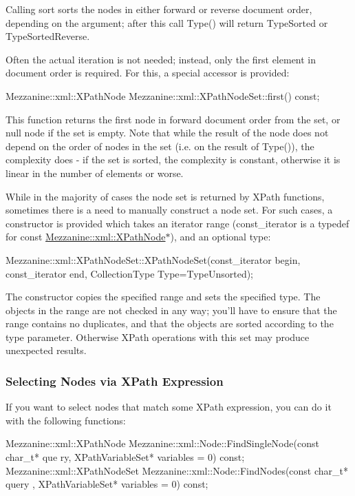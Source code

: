 Calling sort sorts the nodes in either forward or reverse document order, depending on the argument; after this call Type() will return TypeSorted or TypeSortedReverse. \par
 \par
 Often the actual iteration is not needed; instead, only the first element in document order is required. For this, a special accessor is provided: 
\begin{DoxyCode}
 Mezzanine::xml::XPathNode Mezzanine::xml::XPathNodeSet::first() const;
\end{DoxyCode}
 This function returns the first node in forward document order from the set, or null node if the set is empty. Note that while the result of the node does not depend on the order of nodes in the set (i.e. on the result of Type()), the complexity does -\/ if the set is sorted, the complexity is constant, otherwise it is linear in the number of elements or worse. \par
 \par
 While in the majority of cases the node set is returned by XPath functions, sometimes there is a need to manually construct a node set. For such cases, a constructor is provided which takes an iterator range (const\_\-iterator is a typedef for const \hyperlink{classMezzanine_1_1xml_1_1XPathNode}{Mezzanine::xml::XPathNode}$\ast$), and an optional type: 
\begin{DoxyCode}
 Mezzanine::xml::XPathNodeSet::XPathNodeSet(const_iterator begin, const_iterator 
      end, CollectionType Type=TypeUnsorted);
\end{DoxyCode}
 The constructor copies the specified range and sets the specified type. The objects in the range are not checked in any way; you'll have to ensure that the range contains no duplicates, and that the objects are sorted according to the type parameter. Otherwise XPath operations with this set may produce unexpected results. \par
 \par
 \hypertarget{XMLManual_XMLXPathSelecting}{}\subsubsection{Selecting Nodes via XPath Expression}\label{XMLManual_XMLXPathSelecting}
If you want to select nodes that match some XPath expression, you can do it with the following functions: 
\begin{DoxyCode}
 Mezzanine::xml::XPathNode Mezzanine::xml::Node::FindSingleNode(const char_t* que
      ry, XPathVariableSet* variables = 0) const;
 Mezzanine::xml::XPathNodeSet Mezzanine::xml::Node::FindNodes(const char_t* query
      , XPathVariableSet* variables = 0) const;
\end{DoxyCode}
